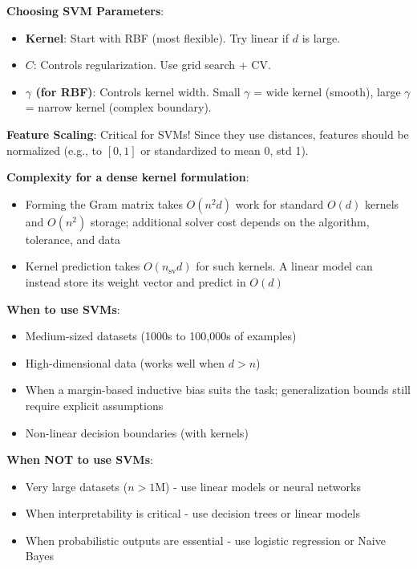 \documentclass[11pt,twoside]{article}
\numberwithin{equation}{section}
\theoremstyle{plain}
\theoremstyle{definition}
\theoremstyle{remark}
\begin{document}
\begin{implementationbox}
\textbf{Choosing SVM Parameters}:

\begin{itemize}
\item \textbf{Kernel}: Start with RBF (most flexible). Try linear if $d$ is large.
\item \textbf{$C$}: Controls regularization. Use grid search + CV.
\item \textbf{$\gamma$ (for RBF)}: Controls kernel width. Small $\gamma$ = wide kernel (smooth), large $\gamma$ = narrow kernel (complex boundary).
\end{itemize}

\textbf{Feature Scaling}: Critical for SVMs! Since they use distances, features should be normalized (e.g., to $[0,1]$ or standardized to mean 0, std 1).

\textbf{Complexity for a dense kernel formulation}:
\begin{itemize}
\item Forming the Gram matrix takes $O(n^2d)$ work for standard $O(d)$ kernels and $O(n^2)$ storage; additional solver cost depends on the algorithm, tolerance, and data
\item Kernel prediction takes $O(n_{\text{sv}}d)$ for such kernels. A linear model can instead store its weight vector and predict in $O(d)$
\end{itemize}

\textbf{When to use SVMs}:
\begin{itemize}
\item Medium-sized datasets (1000s to 100,000s of examples)
\item High-dimensional data (works well when $d > n$)
\item When a margin-based inductive bias suits the task; generalization bounds still require explicit assumptions
\item Non-linear decision boundaries (with kernels)
\end{itemize}

\textbf{When NOT to use SVMs}:
\begin{itemize}
\item Very large datasets ($n > 1$M) - use linear models or neural networks
\item When interpretability is critical - use decision trees or linear models
\item When probabilistic outputs are essential - use logistic regression or Naive Bayes
\end{itemize}
\end{implementationbox}
\end{document}
